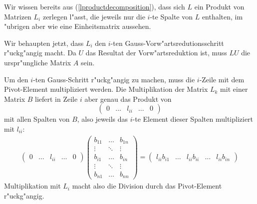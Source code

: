 Wir wissen bereits aus (\ref{lproductdecomposition}), dass sich $L$
ein Produkt von Matrizen $L_i$ zerlegen l"asst, die jeweils nur
die $i$-te Spalte von $L$ enthalten, im "ubrigen aber wie eine Einheitsmatrix
aussehen.

Wir behaupten jetzt, dass $L_i$ den $i$-ten Gauss-Vorw"artsredutionsschritt
r"uck\-g"angig macht.
Da $U$ das Resultat der Vorw"artsreduktion ist, 
muss $LU$ die urspr"ungliche Matrix $A$ sein.

Um den $i$-ten Gauss-Schritt r"uckg"angig zu machen, muss die
$i$-Zeile mit dem Pivot-Element multipliziert werden.
Die Multiplikation
der Matrix $L_k$ mit einer Matrix $B$ liefert in Zeile $i$ aber genau das Produkt
von
\[
\begin{pmatrix}
0&\dots&l_{ii}&\dots &0
\end{pmatrix}
\]
mit allen Spalten von $B$, also jeweils das $i$-te Element dieser
Spalten multipliziert mit $l_{ii}$:
\begin{align*}
\begin{pmatrix}
0&\dots&l_{ii}&\dots &0
\end{pmatrix}
\begin{pmatrix}
b_{11}&\dots &b_{1n}\\
\vdots&\ddots&\vdots\\
b_{i1}&\dots &b_{in}\\
\vdots&\ddots&\vdots\\
b_{n1}&\dots &b_{nn}
\end{pmatrix}
=
\begin{pmatrix}
l_{ii}b_{i1}&\dots &l_{ii}b_{ii}&\dots &l_{ii}b_{in}
\end{pmatrix}
\end{align*}
Multiplikation mit $L_i$ macht
also die Division durch das Pivot-Element r"uckg"angig.

